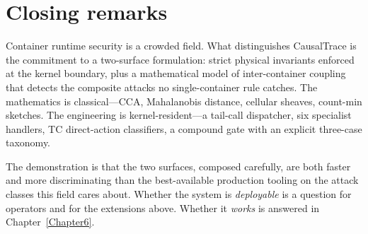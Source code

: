\section{Closing remarks}
\label{sec:conclusion-closing}

Container runtime security is a crowded field. What distinguishes
CausalTrace is the commitment to a two-surface formulation: strict
physical invariants enforced at the kernel boundary, plus a mathematical
model of inter-container coupling that detects the composite attacks no
single-container rule catches. The mathematics is classical---CCA,
Mahalanobis distance, cellular sheaves, count-min sketches. The
engineering is kernel-resident---a tail-call dispatcher, six specialist
handlers, TC direct-action classifiers, a compound gate with an explicit
three-case taxonomy.

The demonstration is that the two surfaces, composed carefully, are both
faster and more discriminating than the best-available production
tooling on the attack classes this field cares about. Whether the
system is \emph{deployable} is a question for operators and for the
extensions above. Whether it \emph{works} is answered in
Chapter~\ref{Chapter6}.

